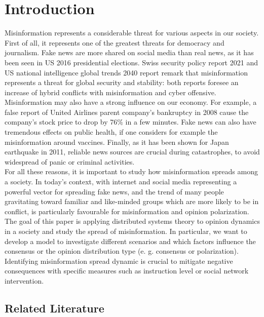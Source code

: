 \section{Introduction}

Misinformation represents a considerable threat for various aspects in our society. First of all, it represents one of the greatest threats for democracy and journalism\cite{Zhou2019}. Fake news are more shared on social media than real news, as it has been seen in US 2016 presidential elections\cite{Zhou2020}. Swiss security policy report 2021\cite{swiss2021} and US national intelligence global trends 2040 report \cite{us2021} remark that misinformation represents a threat for global security and stability: both reports foresee an increase of hybrid conflicts with misinformation and cyber offensive. Misinformation may also have a strong influence on our economy. For example, a false report of United Airlines parent company's bankruptcy in 2008 cause the company's stock price to drop by 76$\%$ in a few minutes\cite{carvalho2011}. Fake news can also have tremendous effects on public health, if one considers for example the misinformation around vaccines\cite{Larson2017}. Finally, as it has been shown for Japan earthquake in 2011\cite{Hashimoto2021}, reliable news sources are crucial during catastrophes, to avoid widespread of panic or criminal activities.\\

For all these reasons, it is important to study how misinformation spreads among a society. In today's context, with internet and social media representing a powerful vector for spreading fake news, and the trend of many people gravitating toward familiar and like-minded groups which are more likely to be in conflict, is particularly favourable for misinformation and opinion polarization\cite{us2021}.  The goal of this paper is applying distributed systems theory to opinion dynamics in a society and study the spread of misinformation. In particular, we want to develop a model to investigate different scenarios and which factors influence the consensus or the opinion distribution type (e. g. consensus or polarization).
Identifying misinformation spread dynamic is crucial to mitigate negative consequences with specific measures such as instruction level\cite{joanna2017} or social network intervention\cite{mahak2020}.


\subsection{Related Literature}

